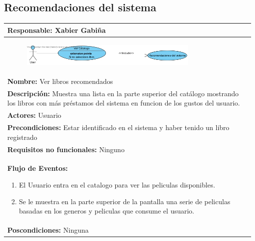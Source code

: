 \documentclass{report}
\begin{document}
        \subsection{Recomendaciones del sistema}
            \begin{center}
                \begin{longtable}{|p{\linewidth}|}
                    \hline
                    \textbf{Responsable:} Xabier Gabiña\\
                    \hline
                    \begin{figure}[H]
                        \centering
                        \includegraphics[width=0.8\textwidth]{./img/casos_uso/RecomendacionesDelSistema.jpg}
                    \end{figure}\\
                    \hline
                    \textbf{Nombre:} Ver libros recomendados\\
                    \hline
                    \textbf{Descripción:} Muestra una lista en la parte superior del catálogo mostrando los libros con más préstamos del sistema en funcion de los gustos del usuario.\\
                    \hline
                    \textbf{Actores:} Usuario\\
                    \hline
                    \textbf{Precondiciones:} Estar identificado en el sistema y haber tenido un libro registrado\\
                    \hline
                    \textbf{Requisitos no funcionales:} Ninguno\\
                    \hline
                    \textbf{Flujo de Eventos:}
                    \begin{enumerate}
                        \item El Usuario entra en el catalogo para ver las peliculas disponibles.
                        \item Se le muestra en la parte superior de la pantalla una serie de peliculas basadas en los generos y peliculas que consume el usuario.
                    \end{enumerate}\\
                    \hline
                    \textbf{Poscondiciones:} Ninguna\\
                    \hline

\end{longtable}
\end{center}
\end{document}
